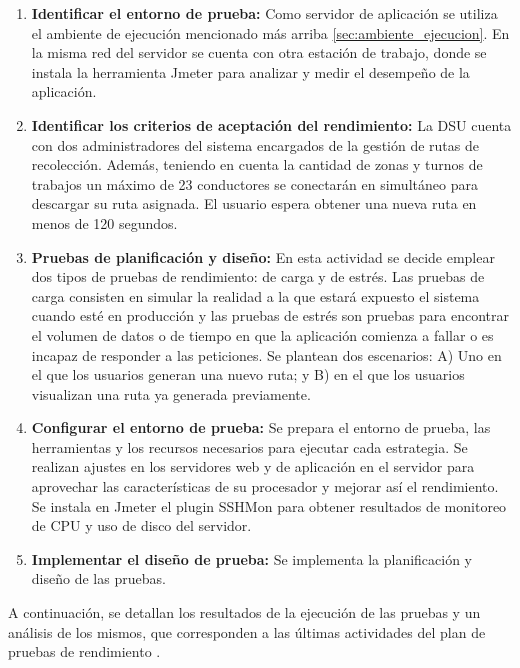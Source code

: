 \begin{enumerate}
    \item \textbf{Identificar el entorno de prueba:}
        Como servidor de aplicación se utiliza el ambiente de ejecución mencionado más arriba \ref{sec:ambiente_ejecucion}. En la misma red del servidor se cuenta con otra estación de trabajo, donde se instala la herramienta Jmeter \citep{ApacheJMeter} para analizar y medir el desempeño de la aplicación.
    \item \textbf{Identificar los criterios de aceptación del rendimiento:}
        La DSU cuenta con dos administradores del sistema encargados de la gestión de rutas de recolección. Además, teniendo en cuenta la cantidad de zonas y turnos de trabajos un máximo de 23 conductores se conectarán en simultáneo para descargar su ruta asignada. El usuario espera obtener una nueva ruta en menos de 120 segundos.
    \item \textbf{Pruebas de planificación y diseño:}
        En esta actividad se decide emplear dos tipos de pruebas de rendimiento: de carga y de estrés. Las pruebas de carga consisten en simular la realidad a la que estará expuesto el sistema cuando esté en producción y las pruebas de estrés son pruebas para encontrar el volumen de datos o de tiempo en que la aplicación comienza a fallar o es incapaz de responder a las peticiones.
        Se plantean dos escenarios: A) Uno en el que los usuarios generan una nuevo ruta; y B) en el que los usuarios visualizan una ruta ya generada previamente.
    \item \textbf{Configurar el entorno de prueba:}
        Se prepara el entorno de prueba, las herramientas y los recursos necesarios para ejecutar cada estrategia. Se realizan ajustes en los servidores web y de aplicación en el servidor para aprovechar las características de su procesador y mejorar así el rendimiento. Se instala en Jmeter el plugin SSHMon \citep{Jmeter-sshmon} para obtener resultados de monitoreo de CPU y uso de disco del servidor.
    \item \textbf{Implementar el diseño de prueba:}
        Se implementa la planificación y diseño de las pruebas.
\end{enumerate}

A continuación, se detallan los resultados de la ejecución de las pruebas y un análisis de los mismos, que corresponden a las últimas actividades del plan de pruebas de rendimiento \citep{Corporation2007PerformanceApplications}.

